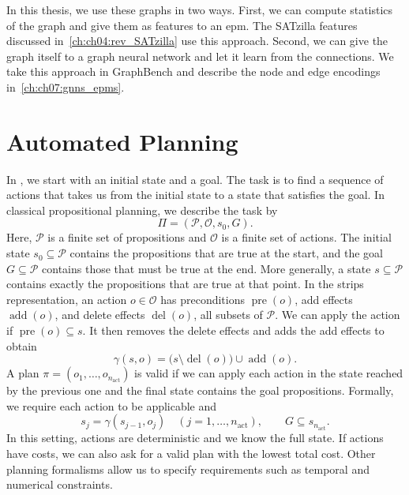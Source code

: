 In this thesis, we use these graphs in two ways. First, we can compute statistics of the graph and give them as features to an \gls{epm}. The SATzilla features discussed in~\cref{ch:ch04:rev_SATzilla} use this approach. Second, we can give the graph itself to a graph neural network and let it learn from the connections. We take this approach in GraphBench and describe the node and edge encodings in~\cref{ch:ch07:gnns_epms}.

\section{Automated Planning}
\label{sec:ch03:planning}

In , we start with an initial state and a goal. The task is to find a sequence of actions that takes us from the initial state to a state that satisfies the goal. In classical propositional planning, we describe the task by
\begin{equation*}
    \Pi = (\mathcal P, \mathcal O, s_0, G).
\end{equation*}
Here, $\mathcal P$ is a finite set of propositions and $\mathcal O$ is a finite set of actions. The initial state $s_0\subseteq\mathcal P$ contains the propositions that are true at the start, and the goal $G\subseteq\mathcal P$ contains those that must be true at the end. More generally, a state $s\subseteq\mathcal P$ contains exactly the propositions that are true at that point. In the \gls{strips} representation, an action $o\in\mathcal O$ has preconditions $\operatorname{pre}(o)$, add effects $\operatorname{add}(o)$, and delete effects $\operatorname{del}(o)$, all subsets of $\mathcal P$. We can apply the action if $\operatorname{pre}(o)\subseteq s$. It then removes the delete effects and adds the add effects to obtain
\begin{equation*}
    \gamma(s,o) = \bigl(s \setminus \operatorname{del}(o)\bigr)
    \cup \operatorname{add}(o).
\end{equation*}
A plan $\pi=(o_1,\ldots,o_{n_{\mathrm{act}}})$ is valid if we can apply each action in the state reached by the previous one and the final state contains the goal propositions. Formally, we require each action to be applicable and
\begin{equation*}
    s_j = \gamma(s_{j-1},o_j)
    \quad (j=1,\ldots,n_{\mathrm{act}}),
    \qquad G \subseteq s_{n_{\mathrm{act}}}.
\end{equation*}
In this setting, actions are deterministic and we know the full state. If actions have costs, we can also ask for a valid plan with the lowest total cost. Other planning formalisms allow us to specify requirements such as temporal and numerical constraints.

